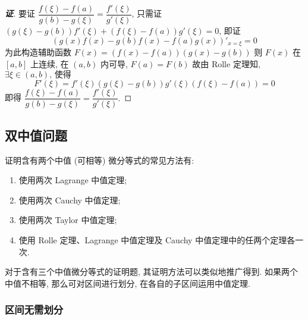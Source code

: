\begin{proof}[{\songti \textbf{证}}]
    要证 $\dfrac{f(\xi)-f(a)}{g(b)-g(\xi)}=\dfrac{f'(\xi)}{g'(\xi)}$, 只需证 $(g(\xi)-g(b))f'(\xi)+(f(\xi)-f(a))g'(\xi)=0$, 
    即证 $$(g(x)f(x)-g(b)f(x)-f(a)g(x))'_{x=\xi}=0$$
    为此构造辅助函数 $F(x)=(f(x)-f(a))(g(x)-g(b))$ 则 $F(x)$ 在 $[a,b]$ 上连续, 在 $(a,b)$ 内可导, 
    $F(a)=F(b)$ 故由 Rolle 定理知, $\exists\xi\in(a,b)\text{, 使得 }$
    $$F'(\xi)=f'(\xi)(g(\xi)-g(b))g'(\xi)(f(\xi)-f(a))=0$$
    即得 $\dfrac{f(\xi)-f(a)}{g(b)-g(\xi)}=\dfrac{f'(\xi)}{g'(\xi)}.$
\end{proof}

\subsection{双中值问题}

证明含有两个中值 (可相等) 微分等式的常见方法有:
\begin{enumerate}[label=(\arabic{*})]
    \item 使用两次 Lagrange 中值定理;
    \item 使用两次 Cauchy 中值定理;
    \item 使用两次 Taylor 中值定理;
    \item 使用 Rolle 定理、Lagrange 中值定理及 Cauchy 中值定理中的任两个定理各一次.
\end{enumerate}
对于含有三个中值微分等式的证明题, 其证明方法可以类似地推广得到.
如果两个中值不相等, 那么可对区间进行划分, 在各自的子区间运用中值定理.

\subsubsection{区间无需划分}

